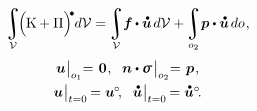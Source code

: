 \nopagebreak
\hspace*{-\parindent}\begin{minipage}{\linewidth}
\begin{equation}\label{dynamicsoflineartheory:integralofenergy}
\displaystyle\integral\displaylimits_{\mathcal{V}} \hspace{-0.4ex} \Bigl( \hspace{-0.1ex} \kinetic + \potential \Bigr)^{\hspace{-0.33ex}\tikz[baseline=-0.2ex] \draw[black, fill=black] (0,0) circle (.28ex);} d\mathcal{V}
= \hspace{-0.2ex}
\displaystyle\integral\displaylimits_{\mathcal{V}} \hspace{-0.5ex} \bm{f} \hspace{-0.1ex} \dotp \mathdotabove{\bm{u}} \hspace{.3ex} d\mathcal{V}
+ \hspace{-0.2ex}
\displaystyle\integral\displaylimits_{o_2} \hspace{-0.4ex} \bm{p} \dotp \mathdotabove{\bm{u}} \hspace{.3ex} do
\hspace{.15ex} ,
\end{equation}
%
\nopagebreak\vspace{-0.25em}\begin{equation*}
\begin{array}{c}
\bm{u} \hspace{.1ex} \bigr|_{o_1} \hspace{-0.64ex} = \hspace{.2ex} \bm{0}
\hspace{.11ex} ,
\hspace*{.6em}
%
\unitnormalvector \dotp \linearstress \hspace{.2ex} \bigr|_{o_2} \hspace{-0.64ex} = \hspace{.2ex} \bm{p}
\hspace{.15ex} ,
\\[.5em]
%
\bm{u} \hspace{.1ex} \bigr|_{t=0} \hspace{-0.2ex} = \bm{u}^{\hspace{-0.1ex}\circ}
\hspace{-0.4ex} ,
\hspace{.6em}
%
\mathdotabove{\bm{u}} \hspace{.1ex} \bigr|_{t=0} \hspace{-0.2ex} = \mathdotabove{\bm{u}}^{\circ}
\hspace{-0.4ex} .
\end{array}
\end{equation*}
\end{minipage}

